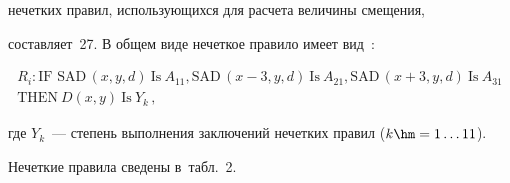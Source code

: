 нечетких правил, использующихся для расчета величины смещения, 


составляет~27. В общем виде нечеткое правило имеет вид~\cite{9-bob, 10-bob}:


  \begin{multline*}


R_i: \mbox{IF } \mathrm{SAD}\,(x,y,d)\ \mbox{Is}\  A_{11}, 


\mathrm{SAD}\,(x-3,y,d)\ \mbox{Is}\ A_{21}, 


\mathrm{SAD}\,(x+3,y,d)\ \mbox{Is}\ A_{31}\\


 \mbox{THEN}\ D(x,y)\ \mbox{Is}\ Y_k\,,


\end{multline*}


где $Y_k$~--- степень выполнения заключений нечетких правил ($k\hm = 


1\ldots11$).


  


  Нечеткие правила сведены в~табл.~2.


  


